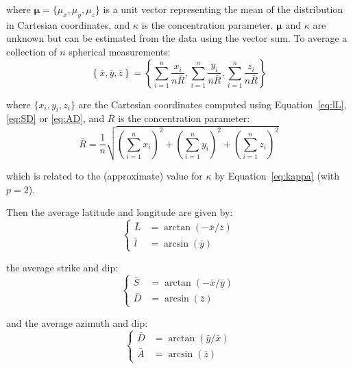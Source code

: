 \noindent where $\mathbf{\mu}=\{\mu_x,\mu_y,\mu_z\}$ is a unit vector
representing the mean of the distribution in Cartesian coordinates,
and $\kappa$ is the concentration parameter. $\mathbf{\mu}$ and
$\kappa$ are unknown but can be estimated from the data using the
vector sum. To average a collection of $n$ spherical measurements:
\begin{equation}
  \left\{\bar{x},\bar{y},\bar{z}\right\} =
  \left\{\sum_{i=1}^{n}\frac{x_i}{n\bar{R}},
  \sum_{i=1}^{n}\frac{y_i}{n\bar{R}},
  \sum_{i=1}^{n}\frac{z_i}{n\bar{R}}
  \right\}
  \label{eq:3Dvectormean}
\end{equation}

\noindent where $\{x_i,y_i,z_i\}$ are the Cartesian coordinates
computed using Equation~\ref{eq:lL}, \ref{eq:SD} or \ref{eq:AD},
and $\bar{R}$ is the concentration parameter:
\begin{equation}
  \bar{R} = \frac{1}{n}
    \sqrt{\left(\sum_{i=1}^{n}x_i\right)^2 +
      \left(\sum_{i=1}^{n}y_i\right)^2 +
      \left(\sum_{i=1}^{n}z_i\right)^2
    }
\end{equation}

\noindent which is related to the (approximate) value for $\kappa$ by
Equation~\ref{eq:kappa} (with $p=2$).

Then the average latitude and longitude are given by:
\begin{equation}
  \left\{
  \begin{split}
  \bar{L} & = \arctan\left(-\bar{x}/\bar{z}\right)\\
  \bar{l} & = \arcsin\left(\bar{y}\right)
  \end{split}
  \right.
\end{equation}

\noindent the average strike and dip:
\begin{equation}
  \left\{
  \begin{split}
    \bar{S} & = \arctan\left(-\bar{x}/\bar{y}\right)\\
    \bar{D} & = \arcsin\left(\bar{z}\right)
  \end{split}
  \right.
\end{equation}

\noindent and the average azimuth and dip:
\begin{equation}
  \left\{
  \begin{split}
    \bar{D} & = \arctan\left(\bar{y}/\bar{x}\right)\\
    \bar{A} & = \arcsin\left(\bar{z}\right)
  \end{split}
  \right.
\end{equation}

